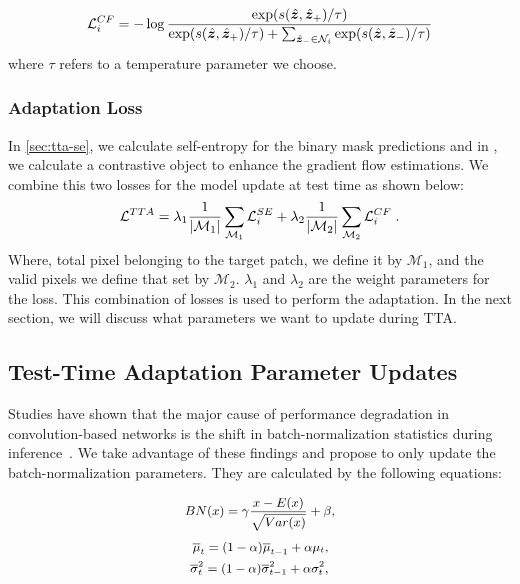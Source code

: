 \begin{equation}
    \small
    \mathcal{L}_i^{CF} = - \log \frac{\exp( s (\hat{\bm{ z}}, \hat{\bm{ z}}_+)/\tau )}{ \exp( s (\hat{\bm{ z}}, \hat{\bm{ z}}_+)/\tau ) + \sum_{\hat{\bm{ z}}_- \in \mathcal{N}_i} \exp( s (\hat{\bm{ z}}, \hat{\bm{ z}}_-)/\tau ) }\\
    \label{eq-contrastive-flow-loss}
  \end{equation}
where $\tau$ refers to a temperature parameter we choose. 

\subsubsection{Adaptation Loss}
In \cref{sec:tta-se}, we calculate self-entropy for the binary mask predictions and in , we calculate a contrastive object to enhance the gradient flow estimations. We combine this two losses for the model update at test time as shown below:
\begin{equation}
    \small
    \mathcal{L}^{TTA} = \lambda_1\frac{1}{| \mathcal{M}_1 |} \sum_{\mathcal{M}_{1}} \mathcal{L}^{SE}_i + \lambda_2\frac{1}{| \mathcal{M}_2 |} \sum_{\mathcal{M}_2} \mathcal{L}^{CF}_i \; .
    \label{eq-tta-loss}
  \end{equation}
Where, total pixel belonging to the target patch, we define it by $\mathcal{M}_1$, and the valid pixels we define that set by $\mathcal{M}_2$. $\lambda_1$ and $\lambda_2$ are the weight parameters for the loss. This combination of losses is used to perform the adaptation. In the next section, we will discuss what parameters we want to update during TTA. 

\subsection{Test-Time Adaptation Parameter Updates}
Studies have shown that the major cause of performance degradation in convolution-based networks is the shift in batch-normalization statistics during inference~\cite{wang2020tent,niu2022efficient,zaveri2025improving,li2016revisiting,mirza2022norm,pan2018two,schneider2020improving}. We take advantage of these findings and propose to only update the batch-normalization parameters. They are calculated by the following equations:

\begin{equation}\small
    \centering
    \label{eq:bn}
        \begin{aligned}  
        BN(x) = \gamma \frac{x - E(x)}{\sqrt{Var(x)}} +  \beta ,
        \end{aligned}
\end{equation}
\begin{equation}\small
    \centering
    \label{eq:bn_running}
        \begin{aligned}  
            \overline{\mu}_t = (1-\alpha)  \overline{\mu}_{t-1} +  \alpha  {\mu}_t ,\\
            \overline{\sigma}_{t}^2 = (1-\alpha) \overline{\sigma}_{t-1}^2 +  \alpha {\sigma}_{t}^2 ,
        \end{aligned}
\end{equation}

